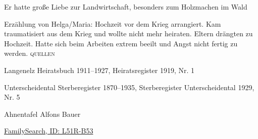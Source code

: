 \begin{person}[
    surname = {Galm},
    givenname = {Julius},
    suffix = {1883--1929},
    label = {@I7@},
    filename = {Julius Galm (1883)}
    ]
Er hatte große Liebe zur Landwirtschaft, besonders zum Holzmachen im Wald

Erzählung von Helga/Maria:
Hochzeit vor dem Krieg arrangiert. Kam traumatisiert aus dem Krieg und wollte nicht mehr heiraten. Eltern drängten zu Hochzeit. Hatte sich beim Arbeiten extrem beeilt und Angst nicht fertig zu werden.
\medbreak
\textsc{{quellen}}
\begin{enumerate}[label={[\arabic*]}]
\item Langenelz Heiratsbuch 1911–1927, Heiratsregister 1919, Nr. 1
\item Unterscheidental Sterberegister 1870–1935, Sterberegister Unterscheidental 1929, Nr. 5
\item Ahnentafel Alfons Bauer
\item \href{https://www.familysearch.org/tree/person/details/L51R-B53}{FamilySearch, ID: L51R-B53}
\end{enumerate}

\end{person}

